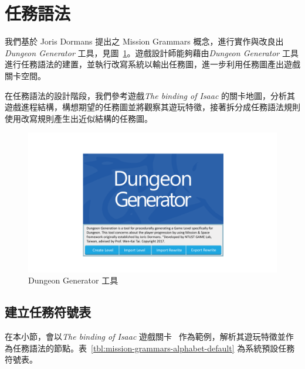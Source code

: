 \section{任務語法}
\label{sec:method-missiongrammars}

我們基於 Joris Dormans 提出之 Mission Grammars 概念，進行實作與改良出\textit{Dungeon Generator} 工具，見圖~\ref{fig:dungeon-generator}。遊戲設計師能夠藉由\textit{Dungeon Generator} 工具進行任務語法的建置，並執行改寫系統以輸出任務圖，進一步利用任務圖產出遊戲關卡空間。

在任務語法的設計階段，我們參考遊戲\textit{The binding of Isaac} 的關卡地圖，分析其遊戲進程結構，構想期望的任務圖並將觀察其遊玩特徵，接著拆分成任務語法規則使用改寫規則產生出近似結構的任務圖。

\begin{figure}[!htb]
  \begin{center}
    \includegraphics[width=1.0\textwidth]{figures/dungeon_generator.pdf}
    \caption{Dungeon Generator 工具} 
    \label{fig:dungeon-generator}
  \end{center}
\end{figure}

\subsection{建立任務符號表}
\label{ssec:method-missiongrammars-alphabet}

在本小節，會以\textit{The binding of Isaac} 遊戲關卡~\cite{isaacWikiRooms} 作為範例，解析其遊玩特徵並作為任務語法的節點。表~\ref{tbl:mission-grammars-alphabet-default} 為系統預設任務符號表。

